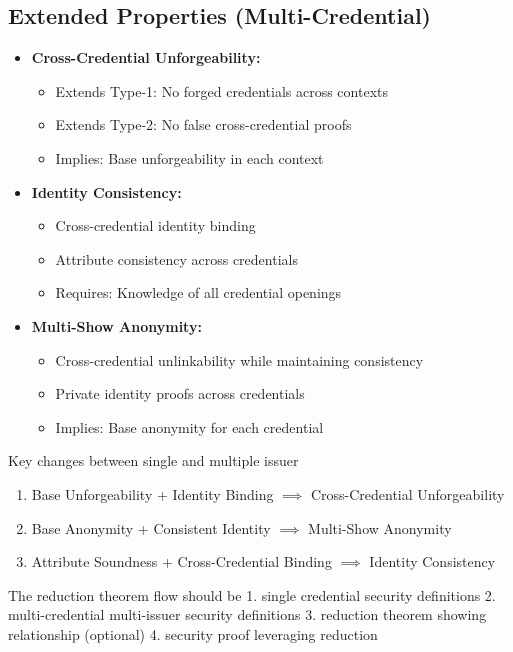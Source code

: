 \subsection{Extended Properties (Multi-Credential)}
\begin{itemize}
    \item \textbf{Cross-Credential Unforgeability:}
    \begin{itemize}
        \item Extends Type-1: No forged credentials across contexts
        \item Extends Type-2: No false cross-credential proofs
        \item Implies: Base unforgeability in each context
    \end{itemize}

    \item \textbf{Identity Consistency:}
    \begin{itemize}
        \item Cross-credential identity binding
        \item Attribute consistency across credentials
        \item Requires: Knowledge of all credential openings
    \end{itemize}

    \item \textbf{Multi-Show Anonymity:}
    \begin{itemize}
        \item Cross-credential unlinkability while maintaining consistency
        \item Private identity proofs across credentials
        \item Implies: Base anonymity for each credential
    \end{itemize}
\end{itemize}

Key changes between single and multiple issuer
\begin{enumerate}
    \item Base Unforgeability + Identity Binding $\implies$ Cross-Credential Unforgeability
    \item Base Anonymity + Consistent Identity $\implies$  Multi-Show Anonymity
    \item Attribute Soundness + Cross-Credential Binding $\implies$ Identity Consistency
\end{enumerate}


The reduction theorem flow should be 
1. single credential security definitions
2. multi-credential multi-issuer security definitions
3. reduction theorem showing relationship (optional)
4. security proof leveraging reduction 






